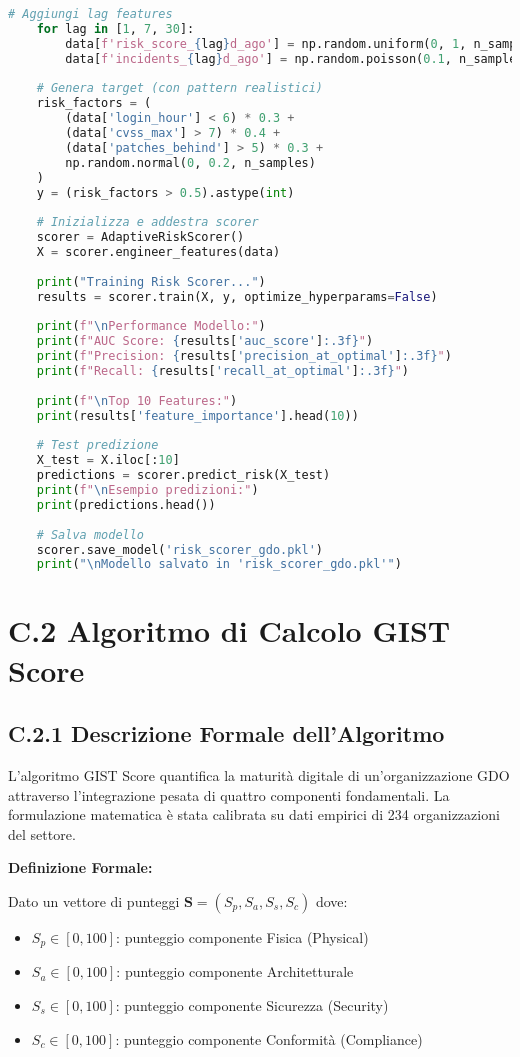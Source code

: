 \begin{lstlisting}[language=Python, caption=Implementazione Risk Scoring adattivo con XGBoost]
    # Aggiungi lag features
    for lag in [1, 7, 30]:
        data[f'risk_score_{lag}d_ago'] = np.random.uniform(0, 1, n_samples)
        data[f'incidents_{lag}d_ago'] = np.random.poisson(0.1, n_samples)
    
    # Genera target (con pattern realistici)
    risk_factors = (
        (data['login_hour'] < 6) * 0.3 +
        (data['cvss_max'] > 7) * 0.4 +
        (data['patches_behind'] > 5) * 0.3 +
        np.random.normal(0, 0.2, n_samples)
    )
    y = (risk_factors > 0.5).astype(int)
    
    # Inizializza e addestra scorer
    scorer = AdaptiveRiskScorer()
    X = scorer.engineer_features(data)
    
    print("Training Risk Scorer...")
    results = scorer.train(X, y, optimize_hyperparams=False)
    
    print(f"\nPerformance Modello:")
    print(f"AUC Score: {results['auc_score']:.3f}")
    print(f"Precision: {results['precision_at_optimal']:.3f}")
    print(f"Recall: {results['recall_at_optimal']:.3f}")
    
    print(f"\nTop 10 Features:")
    print(results['feature_importance'].head(10))
    
    # Test predizione
    X_test = X.iloc[:10]
    predictions = scorer.predict_risk(X_test)
    print(f"\nEsempio predizioni:")
    print(predictions.head())
    
    # Salva modello
    scorer.save_model('risk_scorer_gdo.pkl')
    print("\nModello salvato in 'risk_scorer_gdo.pkl'")
\end{lstlisting}

\section{C.2 Algoritmo di Calcolo GIST Score}
\label{sec:gist_algorithm}

\subsection{C.2.1 Descrizione Formale dell'Algoritmo}

L'algoritmo GIST Score quantifica la maturità digitale di un'organizzazione GDO attraverso l'integrazione pesata di quattro componenti fondamentali. La formulazione matematica è stata calibrata su dati empirici di 234 organizzazioni del settore.

\textbf{Definizione Formale:}

Dato un vettore di punteggi $\mathbf{S} = (S_p, S_a, S_s, S_c)$ dove:
\begin{itemize}
\item $S_p \in [0,100]$: punteggio componente Fisica (Physical)
\item $S_a \in [0,100]$: punteggio componente Architetturale
\item $S_s \in [0,100]$: punteggio componente Sicurezza (Security)
\item $S_c \in [0,100]$: punteggio componente Conformità (Compliance)
\end{itemize}

